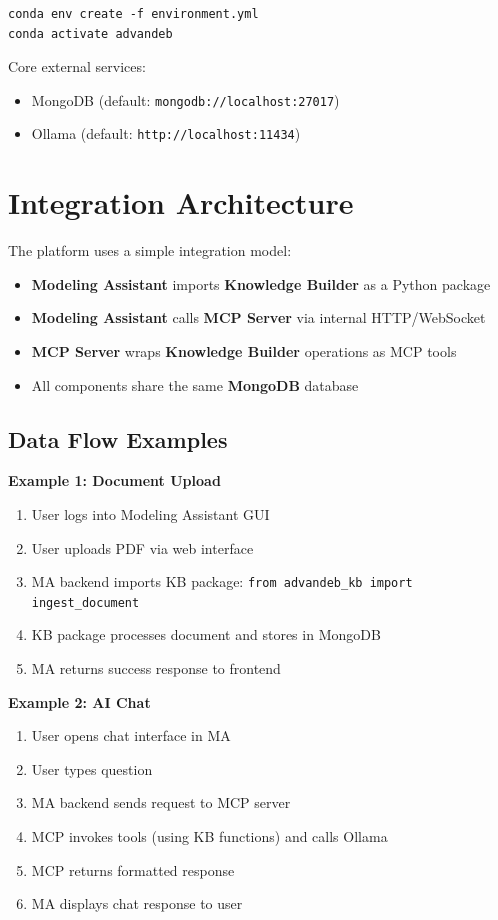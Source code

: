 \documentclass[11pt]{article}
\begin{document}
\begin{verbatim}
conda env create -f environment.yml
conda activate advandeb
\end{verbatim}

Core external services:

\begin{itemize}[noitemsep]
  \item MongoDB (default: \texttt{mongodb://localhost:27017})
  \item Ollama (default: \texttt{http://localhost:11434})
\end{itemize}

\section{Integration Architecture}

The platform uses a simple integration model:

\begin{itemize}[noitemsep]
  \item \textbf{Modeling Assistant} imports \textbf{Knowledge Builder} as a Python package
  \item \textbf{Modeling Assistant} calls \textbf{MCP Server} via internal HTTP/WebSocket
  \item \textbf{MCP Server} wraps \textbf{Knowledge Builder} operations as MCP tools
  \item All components share the same \textbf{MongoDB} database
\end{itemize}

\subsection{Data Flow Examples}

\textbf{Example 1: Document Upload}
\begin{enumerate}[noitemsep]
  \item User logs into Modeling Assistant GUI
  \item User uploads PDF via web interface
  \item MA backend imports KB package: \texttt{from advandeb\_kb import ingest\_document}
  \item KB package processes document and stores in MongoDB
  \item MA returns success response to frontend
\end{enumerate}

\textbf{Example 2: AI Chat}
\begin{enumerate}[noitemsep]
  \item User opens chat interface in MA
  \item User types question
  \item MA backend sends request to MCP server
  \item MCP invokes tools (using KB functions) and calls Ollama
  \item MCP returns formatted response
  \item MA displays chat response to user
\end{enumerate}
\end{document}
